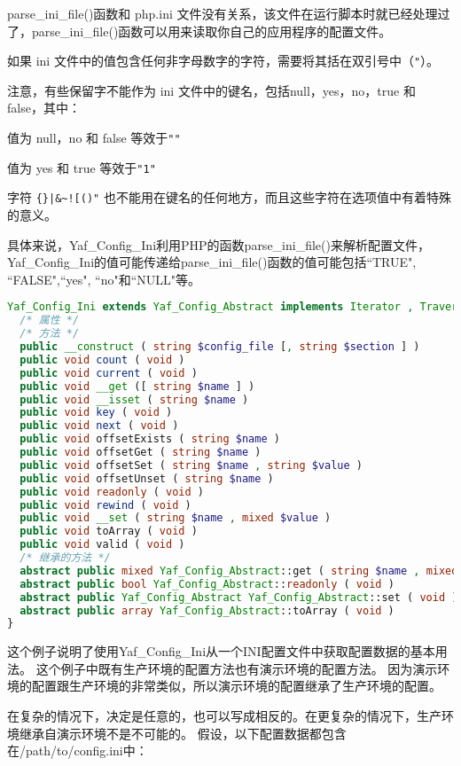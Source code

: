 parse\_ini\_file()函数和 php.ini 文件没有关系，该文件在运行脚本时就已经处理过了，parse\_ini\_file()函数可以用来读取你自己的应用程序的配置文件。

如果 ini 文件中的值包含任何非字母数字的字符，需要将其括在双引号中（\texttt{"}）。

注意，有些保留字不能作为 ini 文件中的键名，包括null，yes，no，true 和 false，其中：

\begin{compactitem}
\item 值为 null，no 和 false 等效于\texttt{""}
\item 值为 yes 和 true 等效于\texttt{"1"}
\end{compactitem}

字符 \texttt{\{\}|\&\~{}![()"} 也不能用在键名的任何地方，而且这些字符在选项值中有着特殊的意义。

具体来说，Yaf\_Config\_Ini利用PHP的函数parse\_ini\_file()来解析配置文件，Yaf\_Config\_Ini的值可能传递给parse\_ini\_file()函数的值可能包括``TRUE", ``FALSE",``yes", ``no"和``NULL"等。

\begin{lstlisting}[language=PHP]
Yaf_Config_Ini extends Yaf_Config_Abstract implements Iterator , Traversable , ArrayAccess , Countable {
  /* 属性 */
  /* 方法 */
  public __construct ( string $config_file [, string $section ] )
  public void count ( void )
  public void current ( void )
  public void __get ([ string $name ] )
  public void __isset ( string $name )
  public void key ( void )
  public void next ( void )
  public void offsetExists ( string $name )
  public void offsetGet ( string $name )
  public void offsetSet ( string $name , string $value )
  public void offsetUnset ( string $name )
  public void readonly ( void )
  public void rewind ( void )
  public void __set ( string $name , mixed $value )
  public void toArray ( void )
  public void valid ( void )
  /* 继承的方法 */
  abstract public mixed Yaf_Config_Abstract::get ( string $name , mixed $value )
  abstract public bool Yaf_Config_Abstract::readonly ( void )
  abstract public Yaf_Config_Abstract Yaf_Config_Abstract::set ( void )
  abstract public array Yaf_Config_Abstract::toArray ( void )
}
\end{lstlisting}


这个例子说明了使用Yaf\_Config\_Ini从一个INI配置文件中获取配置数据的基本用法。 这个例子中既有生产环境的配置方法也有演示环境的配置方法。 因为演示环境的配置跟生产环境的非常类似，所以演示环境的配置继承了生产环境的配置。 

在复杂的情况下，决定是任意的，也可以写成相反的。在更复杂的情况下，生产环境继承自演示环境不是不可能的。 假设，以下配置数据都包含在/path/to/config.ini中：

